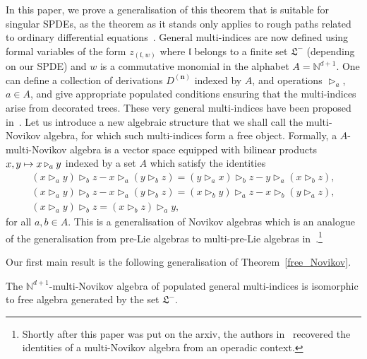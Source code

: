 \documentclass[AHL,Unicode,longabstracts]{cedram}
\newcommand{\bn}{\mathbf{n}}
\newcommand{\mfl}{\mathfrak{l}}
\newcommand{\mfL}{\mathfrak{L}}
\newcommand{\bbN}{\mathbb{N}}
\let\oldmapsto\mapsto
\renewcommand*{\mapsto}{\mathchoice{\longmapsto}{\oldmapsto}{\oldmapsto}{\oldmapsto}}
\begin{document}
In this paper, we prove a generalisation of this theorem that is suitable for singular SPDEs, as the theorem as it stands only applies to rough paths related to ordinary differential equations~\cite{Li23}. General multi-indices are now defined using formal variables of the form $ z_{(\mfl,w)} $ where $\mfl$ belongs to a finite set $\mfL^-$ (depending on our SPDE) and $w$ is a commutative monomial in the alphabet $A=\bbN^{d+1}$. One can define a collection of derivations $ D^{(\bn)} $ indexed by $A$, and operations $\triangleright_a$, $a\in A$, and give appropriate populated conditions ensuring that the multi-indices arise from decorated trees. These very general multi-indices have been proposed in~\cite{BL23}. Let us introduce a new algebraic structure that we shall call the multi-Novikov algebra, for which such multi-indices form a free object. Formally, a $A$-multi-Novikov algebra is a vector space equipped with bilinear products $x,y\mapsto x\triangleright_a y$ indexed by a set $ A $ which satisfy the identities
\begin{gather}
(x \triangleright_a y) \triangleright_b z - x \triangleright_a (y \triangleright_b z) = (y \triangleright_a x) \triangleright_b z - y \triangleright_a (x \triangleright_b z)\label{eq:exchgen_bis}
,
\\ (x \triangleright_a y) \triangleright_b z - x \triangleright_a (y \triangleright_b z) = (x\triangleright_b y) \triangleright_a z - x \triangleright_b (y \triangleright_a z)\label{eq:exchA_bis}
,
\\ (x \triangleright_a y) \triangleright_b z = (x \triangleright_b z)\triangleright_a y\label{eq:rcom_bis}
,
\end{gather}
for all $ a,b\in A$. This is a generalisation of Novikov algebras which is an analogue of the generalisation from pre-Lie algebras to multi-pre-Lie algebras in~\cite{BCCH}.\footnote{Shortly after this paper was put on the arxiv, the authors in~\cite[Example~2.23]{ZGG23} recovered the identities of a multi-Novikov algebra from an operadic context.}

Our first main result is the following generalisation of Theorem~\ref{free_Novikov}.

\begin{theo}\label{free_Novikov_general}
The $\bbN^{d+1}$-multi-Novikov algebra of populated general multi-indices is isomorphic to free algebra generated by the set $\mfL^-$.
\end{theo}
\end{document}
